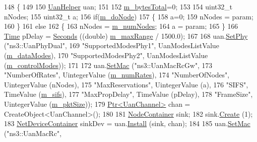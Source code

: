 \begin{DoxyCode}
148 \{
149 
150   \hyperlink{classns3_1_1UanHelper}{UanHelper} uan;
151 
152   \hyperlink{classExperiment_a301a75788bd76a56362d21e5ac3b45ca}{m\_bytesTotal}=0;
153 
154   uint32\_t nNodes;
155   uint32\_t a;
156   \textcolor{keywordflow}{if}(\hyperlink{classExperiment_a7fe0a03d1eb287247ac02760bf3a3dd5}{m\_doNode})
157     \{
158       a=0;
159       nNodes = param;
160     \}
161   \textcolor{keywordflow}{else}
162     \{
163       nNodes = \hyperlink{classExperiment_ac22115998156e9cbf5a2112a1ec9b6bb}{m\_numNodes};
164       a = param;
165     \}
166   \hyperlink{classns3_1_1Time}{Time} pDelay = \hyperlink{group__timecivil_ga33c34b816f8ff6628e33d5c8e9713b9e}{Seconds} ((\textcolor{keywordtype}{double}) \hyperlink{classExperiment_ae46d510ef227a0617af6b665c5ac3d9f}{m\_maxRange} / 1500.0);
167 
168   uan.\hyperlink{classns3_1_1UanHelper_a4435a01bab4cf4d0043b3c2b811ab487}{SetPhy} (\textcolor{stringliteral}{"ns3::UanPhyDual"},
169               \textcolor{stringliteral}{"SupportedModesPhy1"}, UanModesListValue (\hyperlink{classExperiment_a4a7d5680962fc1018b9eaab99475db55}{m\_dataModes}),
170               \textcolor{stringliteral}{"SupportedModesPhy2"}, UanModesListValue (\hyperlink{classExperiment_aba2da123b31bc2ceb2bc5a0470cc8d31}{m\_controlModes}));
171 
172   uan.\hyperlink{classns3_1_1UanHelper_a1c99a2afa329597107452c42eb9c43b9}{SetMac} (\textcolor{stringliteral}{"ns3::UanMacRcGw"},
173               \textcolor{stringliteral}{"NumberOfRates"}, UintegerValue (\hyperlink{classExperiment_abdde6720121e71224882f7b87536d6ff}{m\_numRates}),
174               \textcolor{stringliteral}{"NumberOfNodes"}, UintegerValue (nNodes),
175               \textcolor{stringliteral}{"MaxReservations"}, UintegerValue (a),
176               \textcolor{stringliteral}{"SIFS"}, TimeValue (\hyperlink{classExperiment_a4da00b956aa11609381dae2878c61bed}{m\_sifs}),
177               \textcolor{stringliteral}{"MaxPropDelay"}, TimeValue (pDelay),
178               \textcolor{stringliteral}{"FrameSize"}, UintegerValue (\hyperlink{classExperiment_ae73c947a54c222644fecfefd6d70b5a4}{m\_pktSize}));
179   \hyperlink{classns3_1_1Ptr}{Ptr<UanChannel>} chan = CreateObject<UanChannel>();
180 
181   \hyperlink{classns3_1_1NodeContainer}{NodeContainer} sink;
182   sink.\hyperlink{classns3_1_1NodeContainer_a787f059e2813e8b951cc6914d11dfe69}{Create} (1);
183   \hyperlink{classns3_1_1NetDeviceContainer}{NetDeviceContainer} sinkDev = uan.\hyperlink{classns3_1_1UanHelper_a283475798bb2df2ff11c53b68d2f1361}{Install} (sink, chan);
184 
185   uan.\hyperlink{classns3_1_1UanHelper_a1c99a2afa329597107452c42eb9c43b9}{SetMac} (\textcolor{stringliteral}{"ns3::UanMacRc"},

\end{DoxyCode}
